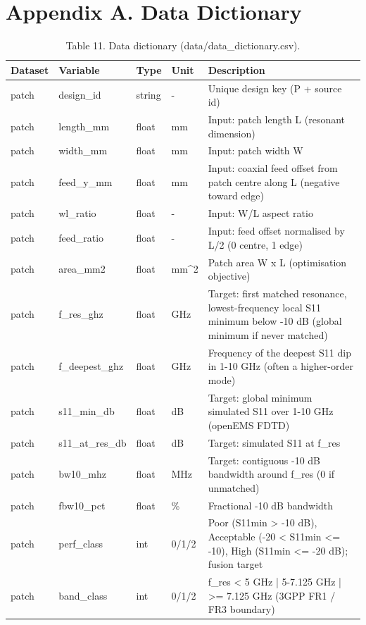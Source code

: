 \documentclass[11pt,a4paper]{article}
\begin{document}
\section*{Appendix A. Data Dictionary}
\begin{table}[H]\centering\small
\caption*{Table 11. Data dictionary (data/data\_dictionary.csv).}
\begin{tabularx}{\linewidth}{XXXXX}
\toprule
\textbf{Dataset} & \textbf{Variable} & \textbf{Type} & \textbf{Unit} & \textbf{Description} \\
\midrule
patch & design\_id & string & - & Unique design key (P + source id) \\
patch & length\_mm & float & mm & Input: patch length L (resonant dimension) \\
patch & width\_mm & float & mm & Input: patch width W \\
patch & feed\_y\_mm & float & mm & Input: coaxial feed offset from patch centre along L (negative toward edge) \\
patch & wl\_ratio & float & - & Input: W/L aspect ratio \\
patch & feed\_ratio & float & - & Input: feed offset normalised by L/2 (0 centre, 1 edge) \\
patch & area\_mm2 & float & mm\textasciicircum{}2 & Patch area W x L (optimisation objective) \\
patch & f\_res\_ghz & float & GHz & Target: first matched resonance, lowest-frequency local S11 minimum below -10 dB (global minimum if never matched) \\
patch & f\_deepest\_ghz & float & GHz & Frequency of the deepest S11 dip in 1-10 GHz (often a higher-order mode) \\
patch & s11\_min\_db & float & dB & Target: global minimum simulated S11 over 1-10 GHz (openEMS FDTD) \\
patch & s11\_at\_res\_db & float & dB & Target: simulated S11 at f\_res \\
patch & bw10\_mhz & float & MHz & Target: contiguous -10 dB bandwidth around f\_res (0 if unmatched) \\
patch & fbw10\_pct & float & \% & Fractional -10 dB bandwidth \\
patch & perf\_class & int & 0/1/2 & Poor (S11min > -10 dB), Acceptable (-20 < S11min <= -10), High (S11min <= -20 dB); fusion target \\
patch & band\_class & int & 0/1/2 & f\_res < 5 GHz | 5-7.125 GHz | >= 7.125 GHz (3GPP FR1 / FR3 boundary) \\

\end{tabularx}
\end{table}
\end{document}
